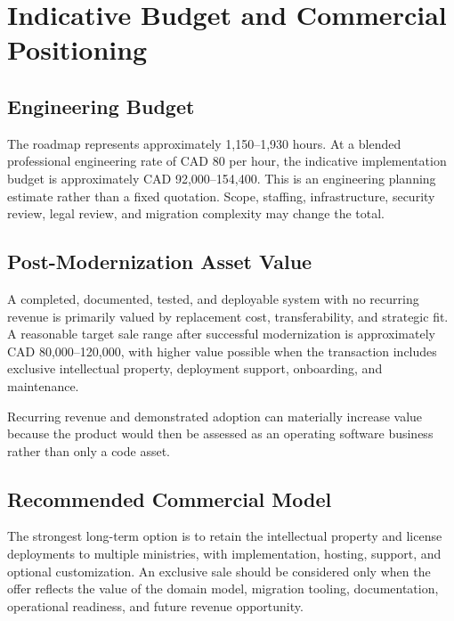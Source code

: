 \documentclass[11pt,a4paper,oneside]{report}
\begin{document}
\chapter{Indicative Budget and Commercial Positioning}

\section{Engineering Budget}

The roadmap represents approximately 1,150--1,930 hours. At a blended professional engineering rate of CAD 80 per hour, the indicative implementation budget is approximately CAD 92,000--154,400. This is an engineering planning estimate rather than a fixed quotation. Scope, staffing, infrastructure, security review, legal review, and migration complexity may change the total.

\section{Post-Modernization Asset Value}

A completed, documented, tested, and deployable system with no recurring revenue is primarily valued by replacement cost, transferability, and strategic fit. A reasonable target sale range after successful modernization is approximately CAD 80,000--120,000, with higher value possible when the transaction includes exclusive intellectual property, deployment support, onboarding, and maintenance.

Recurring revenue and demonstrated adoption can materially increase value because the product would then be assessed as an operating software business rather than only a code asset.

\section{Recommended Commercial Model}

The strongest long-term option is to retain the intellectual property and license deployments to multiple ministries, with implementation, hosting, support, and optional customization. An exclusive sale should be considered only when the offer reflects the value of the domain model, migration tooling, documentation, operational readiness, and future revenue opportunity.

\end{document}

